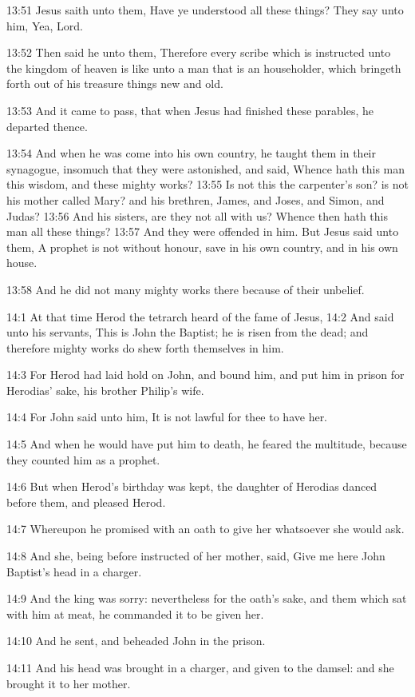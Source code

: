 13:51 Jesus saith unto them, Have ye understood all these things? They say unto him, Yea, Lord.

13:52 Then said he unto them, Therefore every scribe which is instructed unto the kingdom of heaven is like unto a man that is an householder, which bringeth forth out of his treasure things new and old.

13:53 And it came to pass, that when Jesus had finished these parables, he departed thence.

13:54 And when he was come into his own country, he taught them in their synagogue, insomuch that they were astonished, and said, Whence hath this man this wisdom, and these mighty works?  13:55 Is not this the carpenter's son? is not his mother called Mary? and his brethren, James, and Joses, and Simon, and Judas?  13:56 And his sisters, are they not all with us? Whence then hath this man all these things?  13:57 And they were offended in him. But Jesus said unto them, A prophet is not without honour, save in his own country, and in his own house.

13:58 And he did not many mighty works there because of their unbelief.

14:1 At that time Herod the tetrarch heard of the fame of Jesus, 14:2 And said unto his servants, This is John the Baptist; he is risen from the dead; and therefore mighty works do shew forth themselves in him.

14:3 For Herod had laid hold on John, and bound him, and put him in prison for Herodias' sake, his brother Philip's wife.

14:4 For John said unto him, It is not lawful for thee to have her.

14:5 And when he would have put him to death, he feared the multitude, because they counted him as a prophet.

14:6 But when Herod's birthday was kept, the daughter of Herodias danced before them, and pleased Herod.

14:7 Whereupon he promised with an oath to give her whatsoever she would ask.

14:8 And she, being before instructed of her mother, said, Give me here John Baptist's head in a charger.

14:9 And the king was sorry: nevertheless for the oath's sake, and them which sat with him at meat, he commanded it to be given her.

14:10 And he sent, and beheaded John in the prison.

14:11 And his head was brought in a charger, and given to the damsel: and she brought it to her mother.

